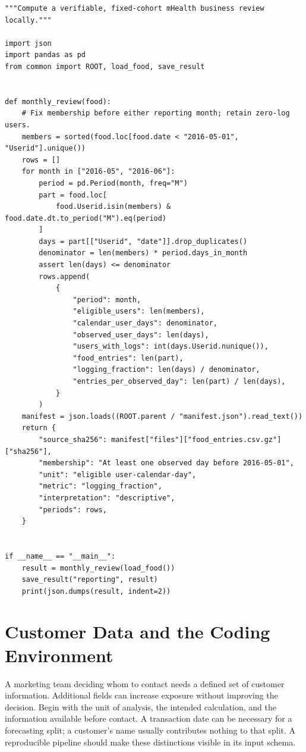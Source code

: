 \begin{Verbatim}[breaklines,breakanywhere,fontsize=\small]
"""Compute a verifiable, fixed-cohort mHealth business review locally."""

import json
import pandas as pd
from common import ROOT, load_food, save_result


def monthly_review(food):
    # Fix membership before either reporting month; retain zero-log users.
    members = sorted(food.loc[food.date < "2016-05-01", "Userid"].unique())
    rows = []
    for month in ["2016-05", "2016-06"]:
        period = pd.Period(month, freq="M")
        part = food.loc[
            food.Userid.isin(members) & food.date.dt.to_period("M").eq(period)
        ]
        days = part[["Userid", "date"]].drop_duplicates()
        denominator = len(members) * period.days_in_month
        assert len(days) <= denominator
        rows.append(
            {
                "period": month,
                "eligible_users": len(members),
                "calendar_user_days": denominator,
                "observed_user_days": len(days),
                "users_with_logs": int(days.Userid.nunique()),
                "food_entries": len(part),
                "logging_fraction": len(days) / denominator,
                "entries_per_observed_day": len(part) / len(days),
            }
        )
    manifest = json.loads((ROOT.parent / "manifest.json").read_text())
    return {
        "source_sha256": manifest["files"]["food_entries.csv.gz"]["sha256"],
        "membership": "At least one observed day before 2016-05-01",
        "unit": "eligible user-calendar-day",
        "metric": "logging_fraction",
        "interpretation": "descriptive",
        "periods": rows,
    }


if __name__ == "__main__":
    result = monthly_review(load_food())
    save_result("reporting", result)
    print(json.dumps(result, indent=2))
\end{Verbatim}

\hypertarget{M01-customer-data-and-the-coding-environment}{%
\section{Customer Data and the Coding
Environment}\label{M01-customer-data-and-the-coding-environment}}

\noindent \noindent A marketing team deciding whom to contact needs a defined set
of customer information. Additional fields can increase exposure without
improving the decision. Begin with the unit of analysis, the intended
calculation, and the information available before contact. A transaction
date can be necessary for a forecasting split; a customer's name usually
contributes nothing to that split. A reproducible pipeline should make
these distinctions visible in its input schema.

